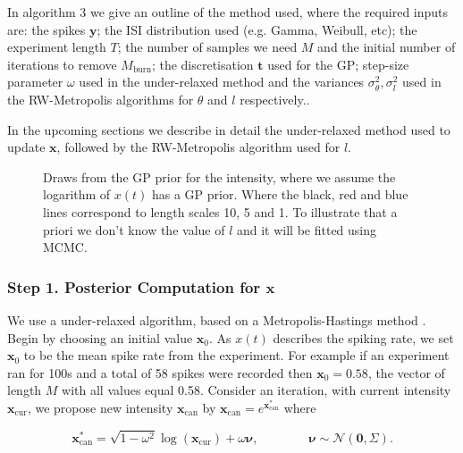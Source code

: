 \documentclass[../main.tex]{subfiles}
\begin{document}
In algorithm 3 we give an outline of the method used, where the required inputs are: the spikes $\mathbf{y}$; the ISI distribution used (e.g. Gamma, Weibull, etc); the experiment length $T$; the number of samples we need $M$ and the initial number of iterations to remove $M_\mathrm{burn}$; the discretisation $\mathbf{t}$ used for the GP; step-size parameter $\omega$ used in the under-relaxed method and the variances $\sigma^2_\theta, \sigma^2_l$ used in the RW-Metropolis algorithms for $\theta$ and $l$ respectively..  

In the upcoming sections we describe in detail the under-relaxed method used to update $\mathbf{x}$, followed by the RW-Metropolis algorithm used for $l$. 

  \begin{figure}[t]
   \hrulefill
   \begin{center} 
    \end{center}     
    \caption{Draws from the GP prior for the intensity, where we assume the logarithm of $x(t)$ has a GP prior. Where the black, red and blue lines correspond to length scales 10, 5 and 1. To illustrate that a priori we don't know the value of $l$ and it will be fitted using MCMC. }
    \label{fig:DrawGP}
    \hrulefill
    \end{figure}


\subsubsection{Step 1. Posterior Computation for $\mathbf{x}$}

We use a under-relaxed algorithm, based on a Metropolis-Hastings method \cite{NEAL}. Begin by choosing an initial value $\mathbf{x}_0$. As $x(t)$ describes the spiking rate, we set $\mathbf{x}_0$ to be the mean spike rate from the experiment. For example if an experiment ran for 100s and a total of 58 spikes were recorded then $\mathbf{x}_0 = \mathbf{0.58}$, the vector of length $M$ with all values equal 0.58. 
Consider an iteration, with current intensity $\mathbf{x}_{\mathrm{cur}}$, we propose new intensity $\mathbf{x}_{\mathrm{can}}$ by $\mathbf{x}_{\mathrm{can}} = e^{\mathbf{x}^*_{\mathrm{can}}}$ where

\begin{equation}\label{eq:GPpropose}
\mathbf{x}^*_{\mathrm{can}} = \sqrt{1-\omega^2} \log (\mathbf{x}_{\mathrm{cur}} ) + \omega \boldsymbol{\nu}, 
\qquad \qquad \boldsymbol{\nu} \sim \mathcal{N}(\mathbf{0}, \Sigma ).
\end{equation}
\end{document}

